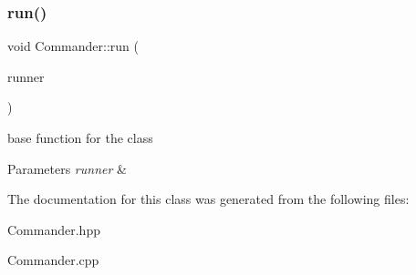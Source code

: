 \subsubsection{\texorpdfstring{run()}{run()}}
{\footnotesize\ttfamily void Commander\+::run (\begin{DoxyParamCaption}\item[{\hyperlink{classProgram}{Runner\+Type} \&}]{runner }\end{DoxyParamCaption})\hspace{0.3cm}{\ttfamily [static]}}

base function for the class 
\begin{DoxyParams}{Parameters}
{\em runner} & \\
\hline
\end{DoxyParams}


The documentation for this class was generated from the following files\+:\begin{DoxyCompactItemize}
\item 
Commander.\+hpp\item 
Commander.\+cpp\end{DoxyCompactItemize}
